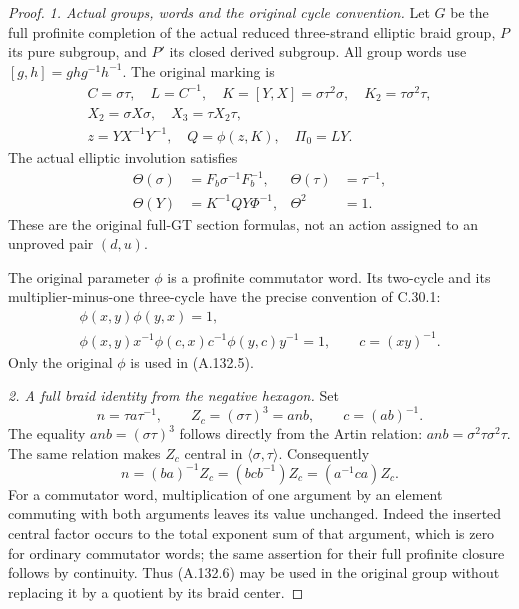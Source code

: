 \begin{proof}
\emph{1. Actual groups, words and the original cycle convention.}
Let \(G\) be the full profinite completion of the actual reduced
three-strand elliptic braid group, \(P\) its pure subgroup, and
\(P'\) its closed derived subgroup. All group words use
\([g,h]=ghg^{-1}h^{-1}\). The original marking is
\[
\begin{gathered}
 C=\sigma\tau,\quad L=C^{-1},\quad
 K=[Y,X]=\sigma\tau^2\sigma,\quad K_2=\tau\sigma^2\tau,\\
 X_2=\sigma X\sigma,\quad X_3=\tau X_2\tau,\\
 z=YX^{-1}Y^{-1},\quad Q=\phi(z,K),\quad \Pi_0=LY.
\end{gathered}                                             \tag{A.132.3}
\]
The actual elliptic involution satisfies
\[
\begin{aligned}
 \Theta(\sigma)&=F_b\sigma^{-1}F_b^{-1},&
 \Theta(\tau)&=\tau^{-1},\\
 \Theta(Y)&=K^{-1}QY\Phi^{-1},& \Theta^2&=1.
\end{aligned}                                             \tag{A.132.4}
\]
These are the original full-GT section formulas, not an action
assigned to an unproved pair \((d,u)\).

The original parameter \(\phi\) is a profinite commutator word.
Its two-cycle and its multiplier-minus-one three-cycle have the
precise convention of C.30.1:
\[
\begin{gathered}
 \phi(x,y)\phi(y,x)=1,\\
 \phi(x,y)x^{-1}\phi(c,x)c^{-1}
                 \phi(y,c)y^{-1}=1,\qquad c=(xy)^{-1}.
\end{gathered}                                             \tag{A.132.5}
\]
Only the original \(\phi\) is used in (A.132.5).

\par\smallskip\noindent\emph{2. A full braid identity from the negative hexagon.}
Set
\[
 n=\tau a\tau^{-1},\qquad
 Z_c=(\sigma\tau)^3=a n b,\qquad c=(ab)^{-1}.
\]
The equality \(a n b=(\sigma\tau)^3\) follows directly from
the Artin relation: \(a n b=\sigma^2\tau\sigma^2\tau\).
The same relation makes \(Z_c\) central in
\(\langle\sigma,\tau\rangle\). Consequently
\[
 n=(ba)^{-1}Z_c=(bcb^{-1})Z_c=(a^{-1}ca)Z_c.
 \tag{A.132.6}
\]
For a commutator word, multiplication of one argument by an element
commuting with both arguments leaves its value unchanged. Indeed
the inserted central factor occurs to the total exponent sum of
that argument, which is zero for ordinary commutator words; the
same assertion for their full profinite closure follows by
continuity. Thus (A.132.6) may be used in the original group
without replacing it by a quotient by its braid center.


\end{proof}
